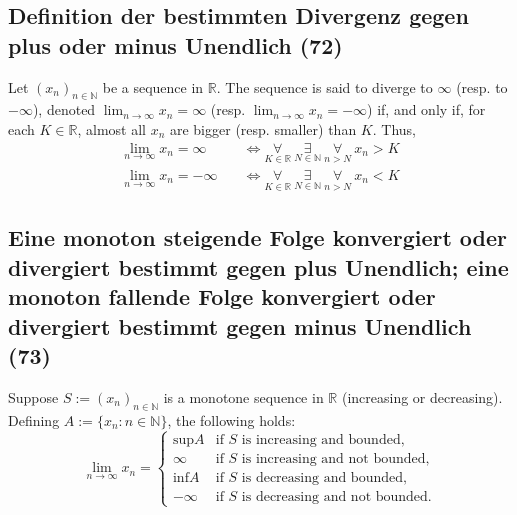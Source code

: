 \subsection{Definition der bestimmten Divergenz gegen plus oder minus Unendlich (72)}
Let $(x _ { n }) _ { n \in \mathbb { N } }$ be a sequence in $\mathbb{R}$. The sequence is said to diverge to
$\infty$ (resp. to $-\infty$), denoted $\lim _ { n \rightarrow \infty } x _ { n } = \infty$ (resp. $\lim _ { n \rightarrow \infty } x _ { n } = -\infty$) if, and only if, for
each $K \in \mathbb { R }$, almost all $x_n$ are bigger (resp. smaller) than $K$. Thus,
\begin{align}
\lim _ { n \rightarrow \infty } x _ { n } = \infty \quad & \Leftrightarrow \underset{K \in \mathbb{R}}{\forall} \ \underset{N \in \mathbb{N}}{\exists} \ \underset{n > N}{\forall}  \ x _ { n } > K \\
\lim _ { n \rightarrow \infty } x _ { n } = -\infty \quad & \Leftrightarrow \underset{K \in \mathbb{R}}{\forall} \ \underset{N \in \mathbb{N}}{\exists} \ \underset{n > N}{\forall}  \ x _ { n } < K
\end{align}

\subsection{Eine monoton steigende Folge konvergiert oder divergiert bestimmt gegen plus Unendlich; eine monoton fallende Folge konvergiert oder divergiert bestimmt gegen minus Unendlich (73)}
Suppose $S := (x_n)_{n \in \mathbb{N}}$ is a monotone sequence in $\mathbb{R}$ (increasing or decreasing). Defining $A := \{x_n : n \in \mathbb{N}\}$, the following holds:
\begin{equation}
\lim\limits_{n\rightarrow \infty}x_n =
\begin{cases}
\text{sup}A & \text{if $S$ is increasing and bounded,} \\
\infty & \text{if $S$ is increasing and not bounded,} \\
\text{inf}A & \text{if $S$ is decreasing and bounded,} \\
-\infty & \text{if $S$ is decreasing and not bounded.}
\end{cases}
\end{equation}

